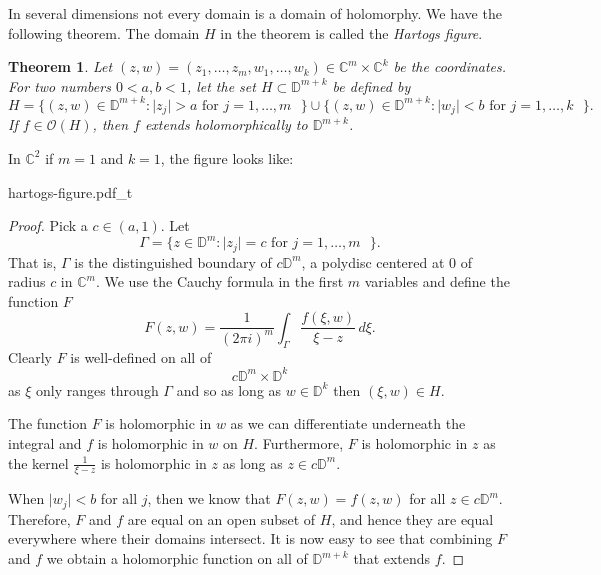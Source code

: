 \documentclass[12pt,openany]{book}
\newcommand{\sabs}[1]{\lvert {#1} \rvert}
\newcommand{\C}{{\mathbb{C}}}
\newcommand{\D}{{\mathbb{D}}}
\newcommand{\sO}{{\mathcal{O}}}
\newcommand{\myindex}[1]{#1\index{#1}}
\theoremstyle{plain}
\newtheorem{thm}{Theorem}[section]
\theoremstyle{remark}
\theoremstyle{definition}
\theoremstyle{exercise}
\theoremstyle{example}
\begin{document}
In several dimensions not every domain is a domain of holomorphy.  We have
the following theorem.  The domain $H$ in the theorem is called the
\emph{\myindex{Hartogs figure}}.

\begin{thm}
Let $(z,w) = (z_1,\ldots,z_m,w_{1},\ldots,w_{k}) \in \C^m \times \C^k$ be the coordinates.  For two numbers
$0 < a,b < 1$, let the set $H \subset \D^{m+k}$
be defined by
\begin{equation*}
H = \bigl\{ (z,w) \in \D^{m+k} : \sabs{z_j} > a \text{ for $j=1,\ldots,m$ }
\bigr\} \cup
\bigl\{ (z,w) \in \D^{m+k} : \sabs{w_j} < b \text{ for $j=1,\ldots,k$ }
\bigr\} .
\end{equation*}
If $f \in \sO(H)$, then $f$ extends holomorphically to $\D^{m+k}$.
\end{thm}

In $\C^2$ if $m=1$ and $k=1$, the figure looks like:


\newcommand{\hartogstext}{\parbox[t]{2.5in}{In diagrams, often the Hartogs figure is
drawn as:}}
\begin{center}
{hartogs-figure.pdf_t}
\end{center}



\begin{proof}
Pick a $c \in (a,1)$.  Let
\begin{equation*}
\Gamma =
\{ z \in \D^{m} : \sabs{z_j} = c \text{ for $j=1,\ldots,m$ } \}.
\end{equation*}
That is, $\Gamma$ is the distinguished boundary of $c \D^m$,
a polydisc centered at 0 of radius $c$ in $\C^m$.
We use the Cauchy formula in the first $m$ variables and
define the function $F$
\begin{equation*}
F(z,w)
=
\frac{1}{{(2\pi i)}^m}
\int_\Gamma \frac{f(\xi,w)}{\xi-z} \, d\xi .
\end{equation*}
Clearly $F$ is well-defined on all of
\begin{equation*}
c\D^m \times \D^k
\end{equation*}
as $\xi$ only
ranges through $\Gamma$ and so as long as $w \in \D^k$ then $(\xi,w) \in H$.

The function $F$ is holomorphic in $w$ as we can differentiate
underneath the integral and $f$ is holomorphic in $w$ on $H$.  Furthermore,
$F$ is holomorphic in $z$ as the kernel $\frac{1}{\xi-z}$ is holomorphic in
$z$ as long as $z \in c\D^m$.

When $\sabs{w_j} < b$ for all $j$, then we know that $F(z,w) = f(z,w)$
for all $z \in c \D^m$.  Therefore, $F$ and $f$ are equal on an open subset
of $H$, and hence they are equal everywhere where their domains intersect.
It is now easy to see that combining $F$ and $f$ we obtain a holomorphic
function on all of $\D^{m+k}$ that extends $f$.
\end{proof}
\end{document}
